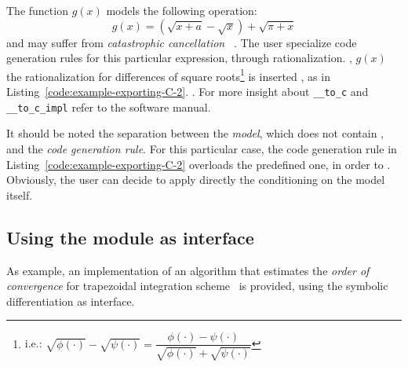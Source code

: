 The function $g(x)$ models the following operation:
\begin{equation}
g(x) = (\sqrt{x + a} - \sqrt{x}) + \sqrt{\pi + x}
\end{equation}
and may suffer from \emph{catastrophic  cancellation}~\cite{higham2002accuracy} . The user  specialize code generation rules for this particular expression,  through rationalization. , $g(x)$ the rationalization for differences of square roots\footnote{i.e.:
$\sqrt{\phi(\cdot)} - \sqrt{\psi(\cdot)} =
\dfrac{\phi(\cdot) - \psi(\cdot)}{\sqrt{\phi(\cdot)} + \sqrt{\psi(\cdot)}}$} is inserted , as in Listing~\ref{code:example-exporting-C-2}.
. For more insight about \verb!__to_c! and \verb!__to_c_impl!\review{,} refer to the software manual.

\noindent%


It should be noted the separation between the \emph{model}, which does not contain , and the \emph{code generation rule}. For this particular case, the code generation rule in Listing~\ref{code:example-exporting-C-2} overloads the predefined one, in order to . Obviously, the user can decide to apply directly the conditioning on the model itself.

\noindent%
\begin{minipage}{.5\textwidth}

\end{minipage}\hfill
\begin{minipage}{.5\textwidth}

\end{minipage}

\subsection{Using the module as interface}
As example, an implementation of an algorithm that estimates the \emph{order of convergence} for trapezoidal integration scheme~\cite{weideman2002numerical} is provided, using the symbolic differentiation as interface.

